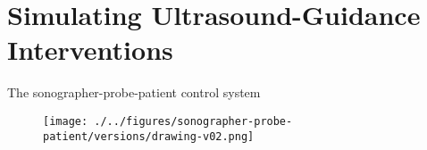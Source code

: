 


\section{Simulating Ultrasound-Guidance Interventions}


{
\begin{frame}{The sonographer-probe-patient control system}
      \begin{figure}
        \centering
        \texttt{[image: ./../figures/sonographer-probe-patient/versions/drawing-v02.png]}
      \end{figure}
\end{frame}
}





%
%
%
%
%
%
%
